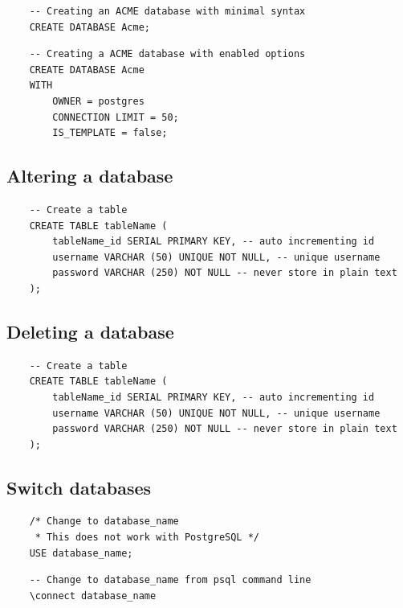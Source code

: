 \begin{verbatim}
    -- Creating an ACME database with minimal syntax
    CREATE DATABASE Acme;
\end{verbatim}

\begin{verbatim}
    -- Creating a ACME database with enabled options
    CREATE DATABASE Acme 
    WITH
        OWNER = postgres
        CONNECTION LIMIT = 50;
        IS_TEMPLATE = false;
\end{verbatim}

\subsection{Altering a database}
\begin{verbatim}
    -- Create a table
    CREATE TABLE tableName (
        tableName_id SERIAL PRIMARY KEY, -- auto incrementing id
        username VARCHAR (50) UNIQUE NOT NULL, -- unique username
        password VARCHAR (250) NOT NULL -- never store in plain text
    );
\end{verbatim}

\subsection{Deleting a database}
\begin{verbatim}
    -- Create a table
    CREATE TABLE tableName (
        tableName_id SERIAL PRIMARY KEY, -- auto incrementing id
        username VARCHAR (50) UNIQUE NOT NULL, -- unique username
        password VARCHAR (250) NOT NULL -- never store in plain text
    );
\end{verbatim}

\subsection{Switch databases}
\begin{verbatim}
    /* Change to database_name
     * This does not work with PostgreSQL */
    USE database_name;
\end{verbatim}

\begin{verbatim}
    -- Change to database_name from psql command line
    \connect database_name
\end{verbatim}


